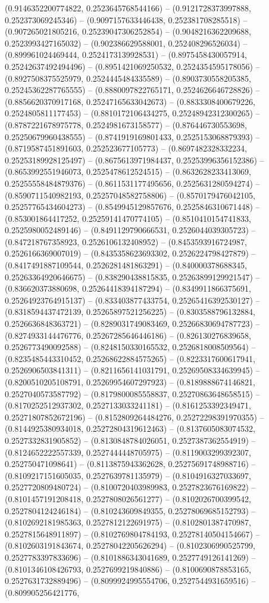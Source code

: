 (0.9146352200774822, 0.2523645768544166) -- (0.9121728373997888, 0.252373069245346) -- (0.9097157633446438, 0.252381708285518) -- (0.907265021805216, 0.25239047306252854) -- (0.9048216362209688, 0.2523993427165032) -- (0.902386629588001, 0.252408296526034) -- (0.899961024469444, 0.2524173139928531) -- (0.8975458430057914, 0.25242637492494496) -- (0.8951421069250532, 0.2524354595178056) -- (0.8927508375525979, 0.2524445484335589) -- (0.8903730558205385, 0.25245362287765555) -- (0.8880097822765171, 0.2524626646728826) -- (0.8856620370917168, 0.25247165633042673) -- (0.8833308400679226, 0.2524805811177453) -- (0.8810172106434275, 0.25248942312300265) -- (0.8787221678975778, 0.2524981673158577) -- (0.876446730553698, 0.25250679960438555) -- (0.8741919169801433, 0.2525153068879393) -- (0.8719587451891603, 0.252523677105773) -- (0.8697482328332234, 0.25253189928125497) -- (0.8675613971984437, 0.25253996356152386) -- (0.8653992551946073, 0.2525478612524515) -- (0.8632628233413069, 0.25255558484879376) -- (0.8611531177495656, 0.2525631280594274) -- (0.8590711540982193, 0.25257048582758806) -- (0.8570179476042105, 0.25257765434604273) -- (0.8549945129857676, 0.2525846310671448) -- (0.853001864417252, 0.25259141470774105) -- (0.8510410154741833, 0.2525980052489146) -- (0.8491129790666531, 0.2526044039305723) -- (0.847218767358923, 0.2526106132408952) -- (0.8453593916724987, 0.2526166369007019) -- (0.8435358623693302, 0.2526224798427879) -- (0.8417491887109544, 0.2526281481863291) -- (0.840000378688345, 0.25263364920646675) -- (0.838290438815835, 0.25263899129921547) -- (0.836620373880698, 0.25264418394187294) -- (0.8349911866375691, 0.25264923764915137) -- (0.833403877433754, 0.25265416392530127) -- (0.8318594437472139, 0.25265897521256225) -- (0.8303588796132884, 0.2526636848363721) -- (0.8289031749083469, 0.25266830694787723) -- (0.8274933144476776, 0.25267285646446186) -- (0.826130276839658, 0.2526773490092588) -- (0.8248150330165532, 0.2526818008509564) -- (0.8235485443310452, 0.25268622884575265) -- (0.8223317600617941, 0.2526906503841311) -- (0.8211656141031791, 0.25269508334639945) -- (0.8200510205108791, 0.25269954607297923) -- (0.8189888674146821, 0.2527040573587792) -- (0.8179800085558837, 0.25270863648658515) -- (0.8170252512937302, 0.2527133033241181) -- (0.8161253392349471, 0.25271807852672196) -- (0.8152809264484276, 0.25272298391970355) -- (0.8144925380934018, 0.25272804319612463) -- (0.8137605083074532, 0.2527332831905852) -- (0.8130848784026051, 0.2527387362554919) -- (0.8124652222557339, 0.2527444448705975) -- (0.8119003299392307, 0.252750471098641) -- (0.8113875943362628, 0.25275691748988716) -- (0.8109217151605035, 0.2527639781135979) -- (0.8104916327033697, 0.2527720809480724) -- (0.8100720403989983, 0.2527823676169822) -- (0.8101457191208418, 0.2527808026561277) -- (0.8102026700399542, 0.2527804124246184) -- (0.810243609849355, 0.25278069685152793) -- (0.8102692181985363, 0.2527812122691975) -- (0.8102801387470987, 0.2527815648911897) -- (0.8102769804784193, 0.25278140504154667) -- (0.8102603191843674, 0.25278042205626294) -- (0.8102306990525799, 0.2527783397833696) -- (0.8101886343041689, 0.2527749126141269) -- (0.8101346108426793, 0.2527699219840886) -- (0.8100690878853165, 0.2527631732889496) -- (0.8099924995554706, 0.2527544931659516) -- (0.809905256421776, 